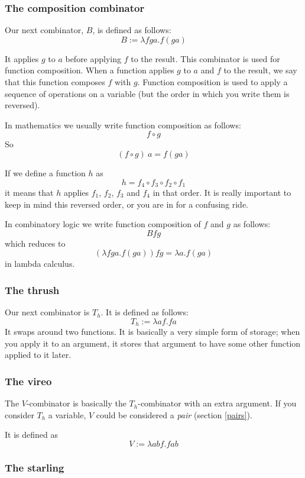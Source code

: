 \documentclass[11pt]{article}
\begin{document}
\subsubsection{The composition combinator}\label{composition}

Our next combinator, \(B\), is defined as follows:
\[B:=\lambda fga.f(ga)\]

It applies \(g\) to \(a\) before applying \(f\) to the result. This combinator
is used for function composition. When a function applies \(g\) to \(a\) and
\(f\) to the result, we say that this function composes \(f\) with \(g\).
Function composition is used to apply a sequence of operations on a variable
(but the order in which you write them is reversed).

In mathematics we usually write function composition as follows:
\[f\circ g\]
So
\[(f\circ g)\ a=f(ga)\]

If we define a function \(h\) as
\[h=f_4\circ f_3\circ f_2\circ f_1\]
it means that \(h\) applies \(f_1\), \(f_2\), \(f_3\) and \(f_4\) in that
order. It is really important to keep in mind this reversed order, or you are in
for a confusing ride.

In combinatory logic we write function composition of \(f\) and \(g\) as
follows:
\[Bfg\]
which reduces to
\[(\lambda fga.f(ga))fg=\lambda a.f(ga)\]
in lambda calculus.

\subsubsection{The thrush}\label{thrush}

Our next combinator is \(T_{h}\). It is defined as follows:
\[T_{h}:=\lambda af.fa\]
It swaps around two functions. It is basically a very simple form of storage;
when you apply it to an argument, it stores that argument to have some other
function applied to it later.


\subsubsection{The vireo}\label{vireo}

The \(V\)-combinator is basically the \(T_h\)-combinator with an extra
argument. If you consider \(T_h\) a variable, \(V\) could be considered a
\emph{pair} (section \ref{pairs}).

It is defined as
\[V:=\lambda abf.fab\]

\subsubsection{The starling}
\end{document}
